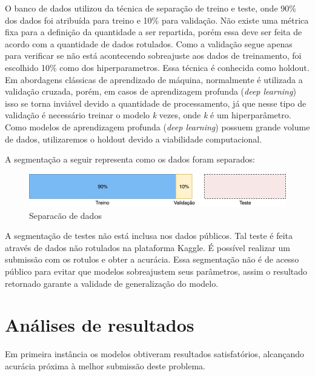 \documentclass[12pt]{article}
\begin{document}
O banco de dados utilizou da técnica de separação de treino e teste, onde 90\% dos dados foi atribuída para treino e 10\% para validação. Não existe uma métrica fixa para a definição da quantidade a ser repartida, porém essa deve ser feita de acordo com a quantidade de dados rotulados. Como a validação segue apenas para verificar se não está acontecendo sobreajuste aos dados de treinamento, foi escolhido 10\% como dos hiperparametros. Essa técnica é conhecida como holdout. Em abordagens clássicas de aprendizado de máquina, normalmente é utilizada a validação cruzada, porém, em casos de aprendizagem profunda (\textit{deep learning}) isso se torna inviável devido a quantidade de processamento, já que nesse tipo de validação é necessário treinar o modelo \textit{k} vezes, onde \textit{k} é um hiperparâmetro. Como modelos de aprendizagem profunda (\textit{deep learning}) possuem grande volume de dados, utilizaremos o holdout devido a viabilidade computacional.

A segmentação a seguir representa como os dados foram separados:

\begin{figure}[!htb]
\centering
\includegraphics[width=1\textwidth]{images/datasplit.png}
\caption{Separacão de dados}
\label{fig:datasplit}
\end{figure}

A segmentação de testes não está inclusa nos dados públicos. Tal teste é feita através de dados não rotulados na plataforma Kaggle. É possível realizar um submissão com os rotulos e obter a acurácia. Essa segmentação não é de acesso público para evitar que modelos sobreajustem seus parâmetros, assim o resultado retornado garante a validade de generalização do modelo.

\section{Análises de resultados}

Em primeira instância os modelos obtiveram resultados satisfatórios, alcançando acurácia próxima à melhor submissão deste problema.
\end{document}
